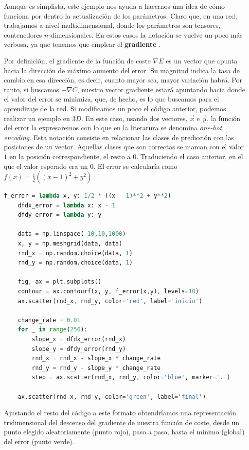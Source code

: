 Aunque es simplista, este ejemplo nos ayuda a hacernos una idea de cómo funciona por dentro la actualización de los parámetros. Claro que, en una red, trabajamos a nivel multidimensional, donde los parámetros son tensores, contenedores $n$-dimensionales. En estos casos la notación se vuelve un poco más verbosa, ya que tenemos que emplear el \textbf{gradiente} \cite{dl_python__chollet_2021}.

Por definición, el gradiente de la función de coste $\nabla E$ es un vector que apunta hacia la dirección de máximo aumento del error. Su magnitud indica la tasa de cambio en esa dirección, es decir, cuanto mayor sea, mayor variación habrá. Por tanto, si buscamos $-\nabla C$, nuestro vector gradiente estará apuntando hacia donde el valor del error se minimiza, que, de hecho, es lo que buscamos para el aprendizaje de la red. Si modificamos un poco el código anterior, podemos realizar un ejemplo en $3D$. En este caso, usando dos vectores, $\vec{x}$ e $\vec{y}$, la función del error la expresaremos con lo que en la literatura se denomina \textit{one-hot encoding}. Esta notación consiste en relacionar las clases de predicción con las posiciones de un vector. Aquellas clases que son correctas se marcan con el valor $1$ en la posición correspondiente, el resto a $0$. Traduciendo el caso anterior, en el que el valor esperado era un $0$. El error se calcularía como $f(x) = \frac{1}{2} ((x-1)^2 + y^2)$.

\begin{lstlisting}[language=Python,label=code:descenso_grad_3d_1]
	f_error = lambda x, y: 1/2 * ((x - 1)**2 + y**2)
	dfdx_error = lambda x: x - 1
	dfdy_error = lambda y: y

	data = np.linspace(-10,10,1000)
	x, y = np.meshgrid(data, data)
	rnd_x = np.random.choice(data, 1)
	rnd_y = np.random.choice(data, 1)

	fig, ax = plt.subplots()
	contour = ax.contourf(x, y, f_error(x,y), levels=10)
	ax.scatter(rnd_x, rnd_y, color='red', label='inicio')

	change_rate = 0.01
	for _ in range(250):
		slope_x = dfdx_error(rnd_x)
		slope_y = dfdy_error(rnd_y)
		rnd_x = rnd_x - slope_x * change_rate
		rnd_y = rnd_y - slope_y * change_rate
		step = ax.scatter(rnd_x, rnd_y, color='blue', marker='.')

	ax.scatter(rnd_x, rnd_y, color='green', label='final')
\end{lstlisting}

Ajustando el resto del código a este formato obtendríamos una representación tridimensional del descenso del gradiente de nuestra función de coste, desde un punto elegido aleatoriamente (punto rojo), paso a paso, hasta el mínimo (global) del error (punto verde).

